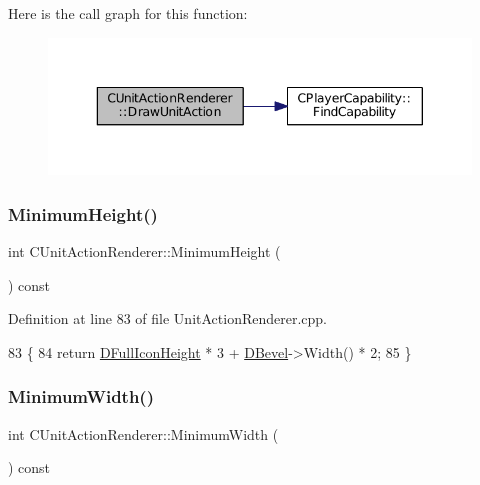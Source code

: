 Here is the call graph for this function\+:
\nopagebreak
\begin{figure}[H]
\begin{center}
\leavevmode
\includegraphics[width=343pt]{classCUnitActionRenderer_aef690a560f7dca2c2cf9051eb4f8d71f_cgraph}
\end{center}
\end{figure}
\hypertarget{classCUnitActionRenderer_aeec570f80477cd6a3d2ec832e686f442}{}\label{classCUnitActionRenderer_aeec570f80477cd6a3d2ec832e686f442} 
\subsubsection{\texorpdfstring{Minimum\+Height()}{MinimumHeight()}}
{\footnotesize\ttfamily int C\+Unit\+Action\+Renderer\+::\+Minimum\+Height (\begin{DoxyParamCaption}{ }\end{DoxyParamCaption}) const}



Definition at line 83 of file Unit\+Action\+Renderer.\+cpp.


\begin{DoxyCode}
83                                             \{
84     \textcolor{keywordflow}{return} \hyperlink{classCUnitActionRenderer_a11b30763b92ed0cbfb842f86fe76fe26}{DFullIconHeight} * 3 + \hyperlink{classCUnitActionRenderer_a3f4012557f7f4d71cfa02df725984ebb}{DBevel}->Width() * 2;
85 \}
\end{DoxyCode}
\hypertarget{classCUnitActionRenderer_ad2d078b041fce9c34264f4670a60c7a3}{}\label{classCUnitActionRenderer_ad2d078b041fce9c34264f4670a60c7a3} 
\subsubsection{\texorpdfstring{Minimum\+Width()}{MinimumWidth()}}
{\footnotesize\ttfamily int C\+Unit\+Action\+Renderer\+::\+Minimum\+Width (\begin{DoxyParamCaption}{ }\end{DoxyParamCaption}) const}



